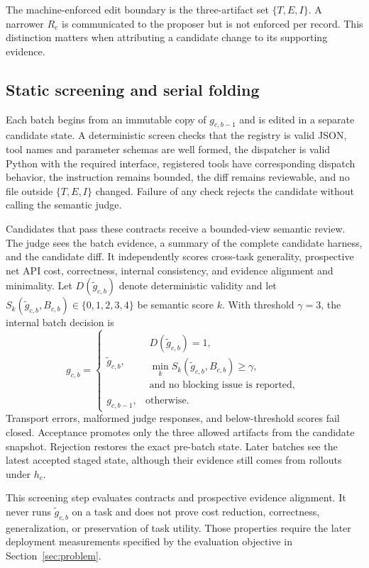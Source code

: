 The machine-enforced edit boundary is the three-artifact set $\{T,E,I\}$. A narrower $R_e$ is communicated to the proposer but is not enforced per record. This distinction matters when attributing a candidate change to its supporting evidence.

\subsection{Static screening and serial folding}

Each batch begins from an immutable copy of $g_{c,b-1}$ and is edited in a separate candidate state. A deterministic screen checks that the registry is valid JSON, tool names and parameter schemas are well formed, the dispatcher is valid Python with the required interface, registered tools have corresponding dispatch behavior, the instruction remains bounded, the diff remains reviewable, and no file outside $\{T,E,I\}$ changed. Failure of any check rejects the candidate without calling the semantic judge.

Candidates that pass these contracts receive a bounded-view semantic review. The judge sees the batch evidence, a summary of the complete candidate harness, and the candidate diff. It independently scores cross-task generality, prospective net API cost, correctness, internal consistency, and evidence alignment and minimality. Let $D(\widetilde g_{c,b})$ denote deterministic validity and let $S_k(\widetilde g_{c,b},B_{c,b})\in\{0,1,2,3,4\}$ be semantic score $k$. With threshold $\gamma=3$, the internal batch decision is
\begin{equation}
g_{c,b}=
\begin{cases}
\widetilde g_{c,b}, &
\substack{D(\widetilde g_{c,b})=1,\\
\min_k S_k(\widetilde g_{c,b},B_{c,b})\geq\gamma,\\
\text{and no blocking issue is reported},}\\
g_{c,b-1}, & \text{otherwise}.
\end{cases}
\label{eq:batch-fold}
\end{equation}
Transport errors, malformed judge responses, and below-threshold scores fail closed. Acceptance promotes only the three allowed artifacts from the candidate snapshot. Rejection restores the exact pre-batch state. Later batches see the latest accepted staged state, although their evidence still comes from rollouts under $h_c$.

This screening step evaluates contracts and prospective evidence alignment. It never runs $\widetilde g_{c,b}$ on a task and does not prove cost reduction, correctness, generalization, or preservation of task utility. Those properties require the later deployment measurements specified by the evaluation objective in Section~\ref{sec:problem}.

